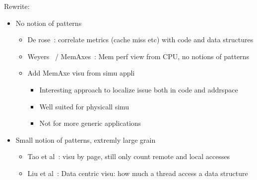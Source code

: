 Rewrite:
\begin{itemize}
    \item No notion of patterns
        \begin{itemize}
            \item De rose~\cite{DeRose01Hardware,DeRose02SIGMA,Bosch00Rivet}: correlate metrics (cache miss etc) with code and data structures
            \item Weyers~\cite{Weyers14Visualization} / MemAxes~\cite{Gimenez14Dissecting}: Mem perf view from CPU, no notions of patterns
            \item Add MemAxe visu from simu appli~\cite{Husain15Relating}
                \begin{itemize}
                    \item Interesting approach to localize issue both in code and addrspace
                    \item Well suited for physicall simu
                    \item Not for more generic applications
                \end{itemize}
        \end{itemize}
    \item Small notion of patterns, extremly large grain
        \begin{itemize}
            \item Tao et al~\cite{Tao01Visualizing}: visu by page, still only count remote and local accesses
            \item Liu et al~\cite{Liu13Datacentric,Liu14Tool}: Data centric visu: how much a thread access a data structure
        \end{itemize}
\end{itemize}


